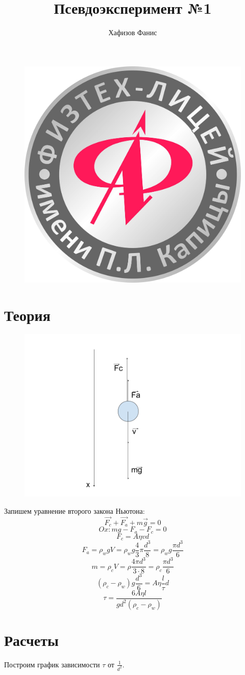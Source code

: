 \documentclass[12pt]{article}
\title{Псевдоэксперимент №1}
\author{Хафизов Фанис}
\begin{document}
	\begin{figure}
		\centering
		\includegraphics[width=0.3\linewidth]{logo}
	\end{figure}
	\maketitle
	\newpage
	\section{Теория}
	\begin{figure}[H]
		\centering
		\includegraphics[width=1.0\linewidth]{pic}
	\end{figure}
	Запишем уравнение второго закона Ньютона:
	$$\vec{F_c}+\vec{F_a}+m\vec{g}=0$$
	$$Ox:mg-F_a-F_c=0$$
	$$F_c=A\eta vd$$
	$$F_a=\rho_wgV=\rho_wg\frac{4}{3}\pi\frac{d^3}{8}=\rho_wg\frac{\pi d^3}{6}$$
	$$m=\rho_c V=\rho\frac{4\pi d^3}{3\cdot8}=\rho_c\frac{\pi d^3}{6}$$
	$$(\rho_c-\rho_w)g\frac{d^3}{6}=A\eta\frac{l}{\tau}d$$
	$$\tau=\frac{6A\eta l}{gd^2(\rho_c-\rho_w)}$$
	\section{Расчеты}
	Построим график зависимости $\tau$ от $\frac{1}{d^2}$.
	
\end{document}
